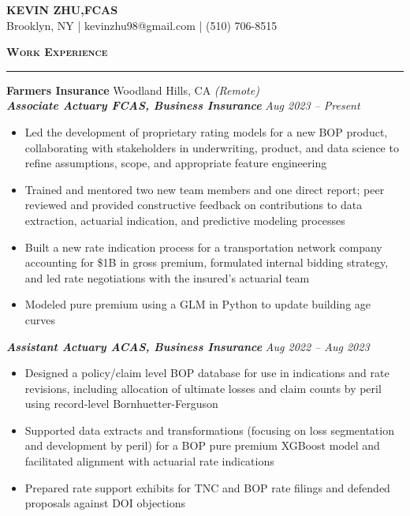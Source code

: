 \documentclass[11pt,letterpaper]{article}
\newcommand{\sectline}{\vspace{5pt}\hrule height 1.5pt\vspace{5pt}}
\newcommand{\sectspace}{\vspace{9pt}}
\newcommand{\heading}[1]{{\fontsize{12pt}{13pt} {\textbf{\textsc{#1}}}}}
\begin{document}
\centering
{\fontsize{13pt}{13pt}\selectfont \textbf{KEVIN ZHU,\hspace{1.7 mm}FCAS}} \vspace{2pt} \\

{\fontsize{11pt}{13pt}\selectfont Brooklyn, NY | kevinzhu98@gmail.com | (510) 706-8515}
\sectspace

\fontsize{11pt}{13.7pt}\selectfont
\raggedright

\heading{Work Experience}\sectline
\textbf{Farmers Insurance} \hfill Woodland Hills, CA \textit{(Remote)}\\
\textbf{\textit{Associate Actuary FCAS, Business Insurance}} \hfill \textit{Aug 2023 -- Present}
\begin{itemize}
	\item Led the development of proprietary rating models for a new BOP product, collaborating with stakeholders in underwriting, product, and data science to refine assumptions, scope, and appropriate feature engineering
	\item Trained and mentored two new team members and one direct report; peer reviewed and provided constructive feedback on contributions to data extraction, actuarial indication, and predictive modeling processes
	\item Built a new rate indication process for a transportation network company accounting for \$1B in gross premium, formulated internal bidding strategy, and led rate negotiations with the insured's actuarial team
	\item Modeled pure premium using a GLM in Python to update building age curves 
\end{itemize}
\textbf{\textit{Assistant Actuary ACAS, Business Insurance}} \hfill \textit{Aug 2022 -- Aug 2023}
\begin{itemize}
	\item Designed a policy/claim level BOP database for use in indications and rate revisions, including allocation of ultimate losses and claim counts by peril using record-level Bornhuetter-Ferguson
	\item Supported data extracts and transformations (focusing on loss segmentation and development by peril) for a BOP pure premium XGBoost model and facilitated alignment with actuarial rate indications
	\item Prepared rate support exhibits for TNC and BOP rate filings and defended proposals against DOI objections
\end{itemize}
\end{document}
